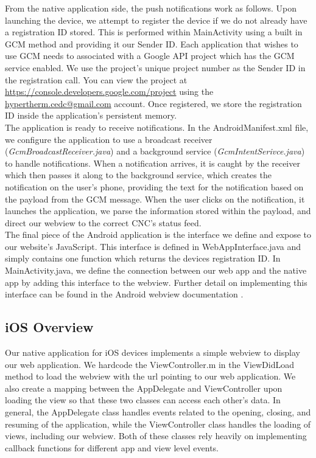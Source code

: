 \documentclass[12pt,letterpaper,titlepage]{article}
\begin{document}
From the native application side, the push notifications work as follows. Upon launching the device, we attempt to register the device if we do not already have a registration ID stored. This is performed within MainActivity using a built in GCM method and providing it our Sender ID. Each application that wishes to use GCM needs to associated with a Google API project which has the GCM service enabled. We use the project's unique project number as the Sender ID in the registration call. You can view the project at \url{https://console.developers.google.com/project} using the \url{hypertherm.cedc@gmail.com} account. Once registered, we store the registration ID inside the application's persistent memory.\\

The application is ready to receive notifications. In the AndroidManifest.xml file, we configure the application to use a broadcast receiver (\textit{GcmBroadcastReceiver.java}) and a background service (\textit{GcmIntentSerivce.java}) to handle notifications. When a notification arrives, it is caught by the receiver which then passes it along to the background service, which creates the notification on the user's phone, providing the text for the notification based on the payload from the GCM message. When the user clicks on the notification, it launches the application, we parse the information stored within the payload, and direct our webview to the correct CNC's status feed.\\

The final piece of the Android application is the interface we define and expose to our website's JavaScript. This interface is defined in WebAppInterface.java and simply contains one function which returns the devices registration ID. In MainActivity.java, we define the connection between our web app and the native app by adding this interface to the webview. Further detail on implementing this interface can be found in the Android webview documentation \cite{android webview}.

\subsection{iOS Overview} \label{doc:iOSOverview}

Our native application for iOS devices implements a simple webview to display our web application. We hardcode the ViewController.m in the ViewDidLoad method to load the webview with the url pointing to our web application. We also create a mapping between the AppDelegate and ViewController upon loading the view so that these two classes can access each other’s data. In general, the AppDelegate class handles events related to the opening, closing, and resuming of the application, while the ViewController class handles the loading of views, including our webview. Both of these classes rely heavily on implementing callback functions for different app and view level events.\\
\end{document}
